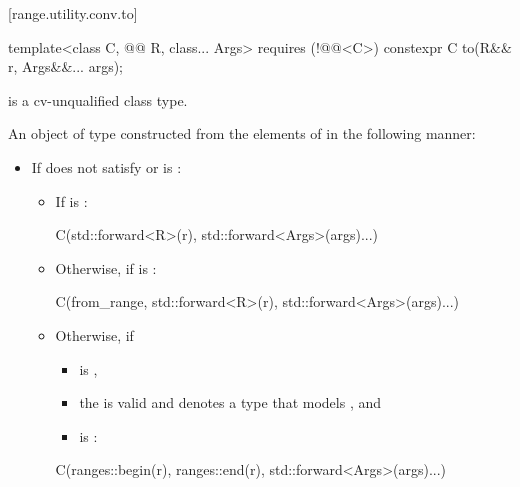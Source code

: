 \documentclass{wg21}
\begin{document}
[range.utility.conv.to]{}

%
\begin{itemdecl}
    template<class C, @@ R, class... Args> requires (!@@<C>)
    constexpr C to(R&& r, Args&&... args);
\end{itemdecl}

\begin{itemdescr}
\pnum
\mandates
{} is a cv-unqualified class type.

\pnum
\returns
An object of type 
constructed from the elements of  in the following manner:
\begin{itemize}
\item
If  does not satisfy  or
is :
\begin{itemize}
    \item
    If  is :
    \begin{codeblock}
        C(std::forward<R>(r), std::forward<Args>(args)...)
    \end{codeblock}
    \item
    Otherwise, if
    is :
    \begin{codeblock}
        C(from_range, std::forward<R>(r), std::forward<Args>(args)...)
    \end{codeblock}
    \item
    Otherwise, if
    \begin{itemize}
        \item
         is ,
        \item
        the 
        is valid and denotes a type that models
        , and
        \item
        is :
    \end{itemize}
    \begin{codeblock}
        C(ranges::begin(r), ranges::end(r), std::forward<Args>(args)...)
    \end{codeblock}

\end{itemize}
\end{itemize}
\end{itemdescr}
\end{document}
